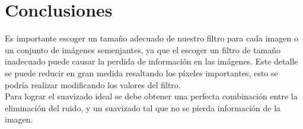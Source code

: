 \documentclass[conference]{IEEEtran}
\begin{document}
\section{Conclusiones}
Es importante escoger un tama\~no adecuado de nuestro filtro para cada imagen o un conjunto de im\'agenes semenjantes, ya que el escoger un filtro de tama\~no inadecuado puede causar la perdida de informaci\'on en las im\'agenes. Este detalle se puede reducir en gran medida resaltando los p\'ixeles importantes, esto se podr\'ia realizar modificando los valores del filtro.\\
Para lograr el suavizado ideal se debe obtener una perfecta combinaci\'on entre la eliminaci\'on del ruido, y un suavizado tal que no se pierda informaci\'on de la imagen.


\end{document}
